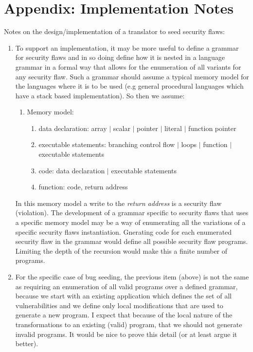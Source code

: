 \section*{Appendix: Implementation Notes}

Notes on the design/implementation of a translator to seed security flaws:
\begin{enumerate}

   \item To support an implementation, it may be more useful to define a grammar for
security flaws and in so doing define how it is nested in a language grammar in a formal
way that allows for the enumeration of all variants for any security flaw.
Such a grammar should assume a typical memory model for the languages
where it is to be used (e.g general procedural languages which have a
stack based implementation).  So then we assume:
      \begin{enumerate}
         \item Memory model:
            \begin{enumerate}
               \item data declaration: array $|$ scalar $|$ pointer $|$ literal $|$ function pointer
               \item executable statements: branching control flow $|$ loops $|$ function $|$ executable statements
               \item code: data declaration $|$ executable statements 
               \item function: code, return address
            \end{enumerate}
      \end{enumerate}
In this memory model a write to the {\em return address} is a security flaw (violation).
The development of a grammar specific to security flaws that uses a specific memory model
may be a way of enumerating all the variations of a specific security flaws instantiation.
Gnerating code for each enumerated security flaw in the grammar would define all possible
security flaw programs.  Limiting the depth of the recursion would make this a finite
number of programs.

   \item For the specific case of bug seeding, the previous item (above) is not the same
         as requiring an enumeration of all valid  programs over
         a defined grammar, because we start with an existing application which defines
         the set of all vulnerabilities and we define only local modifications that
         are used to generate a new program.  I expect that because of the local nature
         of the transformations to an existing (valid) program, that we should not
         generate invalid programs.  It would be nice to prove this detail (or 
         at least argue it better).


\end{enumerate}
